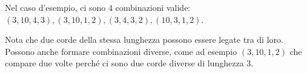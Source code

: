 \Examples

\begin{example}
\end{example}


\Explanation

Nel caso d'esempio, ci sono $4$ combinazioni valide: $(3, 10, 4, 3), (3, 10, 1, 2), (3, 4, 3, 2), (10, 3, 1, 2)$.

Nota che due corde della stessa lunghezza possono essere legate tra di loro. Possono anche formare combinazioni diverse,
come ad esempio $(3, 10, 1, 2)$ che compare due volte perché ci sono due corde diverse di lunghezza 3.